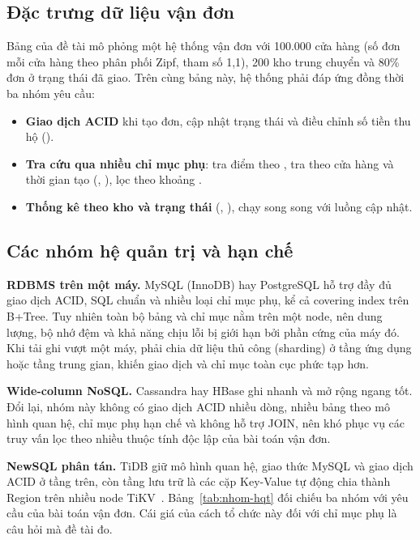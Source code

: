 
\subsection{Đặc trưng dữ liệu vận đơn}
Bảng  của đề tài mô phỏng một hệ thống vận đơn với 100.000 cửa hàng (số đơn mỗi cửa hàng theo phân phối Zipf, tham số 1,1), 200 kho trung chuyển và 80\% đơn ở trạng thái đã giao. Trên cùng bảng này, hệ thống phải đáp ứng đồng thời ba nhóm yêu cầu:
\begin{itemize}
  \item \textbf{Giao dịch ACID} khi tạo đơn, cập nhật trạng thái và điều chỉnh số tiền thu hộ ().
  \item \textbf{Tra cứu qua nhiều chỉ mục phụ}: tra điểm theo , tra theo cửa hàng và thời gian tạo (, ), lọc theo khoảng .
  \item \textbf{Thống kê theo kho và trạng thái} (, ), chạy song song với luồng cập nhật.
\end{itemize}

\subsection{Các nhóm hệ quản trị và hạn chế}
\textbf{RDBMS trên một máy.} MySQL (InnoDB) hay PostgreSQL hỗ trợ đầy đủ giao dịch ACID, SQL chuẩn và nhiều loại chỉ mục phụ, kể cả covering index trên B+Tree. Tuy nhiên toàn bộ bảng và chỉ mục nằm trên một node, nên dung lượng, bộ nhớ đệm và khả năng chịu lỗi bị giới hạn bởi phần cứng của máy đó. Khi tải ghi vượt một máy, phải chia dữ liệu thủ công (sharding) ở tầng ứng dụng hoặc tầng trung gian, khiến giao dịch và chỉ mục toàn cục phức tạp hơn.

\textbf{Wide-column NoSQL.} Cassandra hay HBase ghi nhanh và mở rộng ngang tốt. Đổi lại, nhóm này không có giao dịch ACID nhiều dòng, nhiều bảng theo mô hình quan hệ, chỉ mục phụ hạn chế và không hỗ trợ JOIN, nên khó phục vụ các truy vấn lọc theo nhiều thuộc tính độc lập của bài toán vận đơn.

\textbf{NewSQL phân tán.} TiDB giữ mô hình quan hệ, giao thức MySQL và giao dịch ACID ở tầng trên, còn tầng lưu trữ là các cặp Key-Value tự động chia thành Region trên nhiều node TiKV~\cite{pingcap_arch}. Bảng~\ref{tab:nhom-hqt} đối chiếu ba nhóm với yêu cầu của bài toán vận đơn. Cái giá của cách tổ chức này đối với chỉ mục phụ là câu hỏi mà đề tài đo.

